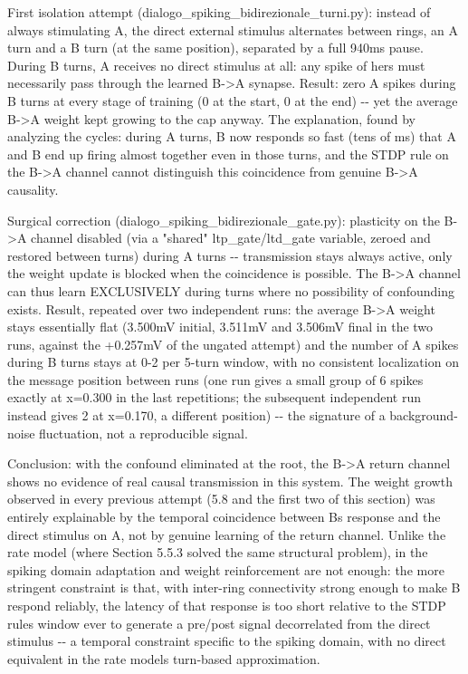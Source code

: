 \documentclass[
  english,
]{article}
\begin{document}
First isolation attempt (dialogo\_\allowbreak{}spiking\_\allowbreak{}bidirezionale\_\allowbreak{}turni.py): instead of always stimulating A, the direct external stimulus alternates between rings, an \textquotesingle A\textquotesingle{} turn and a \textquotesingle B\textquotesingle{} turn (at the same position), separated by a full 940ms pause. During \textquotesingle B\textquotesingle{} turns, A receives no direct stimulus at all: any spike of hers must necessarily pass through the learned B-\textgreater A synapse. Result: zero A spikes during \textquotesingle B\textquotesingle{} turns at every stage of training (0 at the start, 0 at the end) -\/- yet the average B-\textgreater A weight kept growing to the cap anyway. The explanation, found by analyzing the cycles: during \textquotesingle A\textquotesingle{} turns, B now responds so fast (tens of ms) that A and B end up firing almost together even in those turns, and the STDP rule on the B-\textgreater A channel cannot distinguish this coincidence from genuine B-\textgreater A causality.

Surgical correction (dialogo\_\allowbreak{}spiking\_\allowbreak{}bidirezionale\_\allowbreak{}gate.py): plasticity on the B-\textgreater A channel disabled (via a "shared" ltp\_\allowbreak{}gate/ltd\_\allowbreak{}gate variable, zeroed and restored between turns) during \textquotesingle A\textquotesingle{} turns -\/- transmission stays always active, only the weight update is blocked when the coincidence is possible. The B-\textgreater A channel can thus learn EXCLUSIVELY during turns where no possibility of confounding exists. Result, repeated over two independent runs: the average B-\textgreater A weight stays essentially flat (3.500mV initial, 3.511mV and 3.506mV final in the two runs, against the +0.257mV of the ungated attempt) and the number of A spikes during \textquotesingle B\textquotesingle{} turns stays at 0-2 per 5-turn window, with no consistent localization on the message position between runs (one run gives a small group of 6 spikes exactly at x=0.300 in the last repetitions; the subsequent independent run instead gives 2 at x=0.170, a different position) -\/- the signature of a background-noise fluctuation, not a reproducible signal.

Conclusion: with the confound eliminated at the root, the B-\textgreater A return channel shows no evidence of real causal transmission in this system. The weight growth observed in every previous attempt (5.8 and the first two of this section) was entirely explainable by the temporal coincidence between B\textquotesingle s response and the direct stimulus on A, not by genuine learning of the return channel. Unlike the rate model (where Section 5.5.3 solved the same structural problem), in the spiking domain adaptation and weight reinforcement are not enough: the more stringent constraint is that, with inter-ring connectivity strong enough to make B respond reliably, the latency of that response is too short relative to the STDP rule\textquotesingle s window ever to generate a pre/post signal decorrelated from the direct stimulus -\/- a temporal constraint specific to the spiking domain, with no direct equivalent in the rate model\textquotesingle s turn-based approximation.
\end{document}
